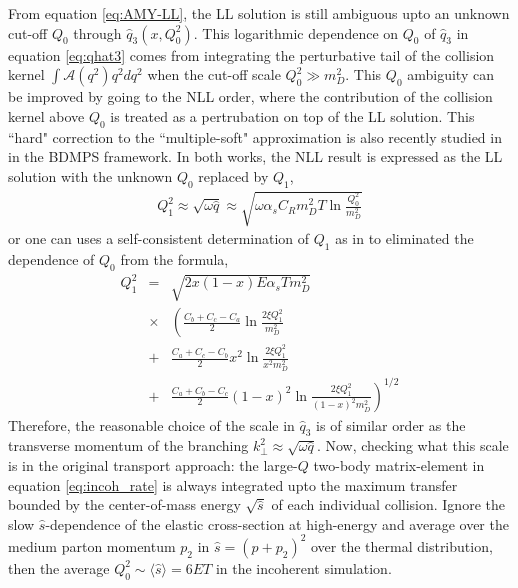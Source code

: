 \documentclass[aps, prc, reprint, amsmath, groupedaddress, nofootinbib]{revtex4-1}
\begin{document}
From equation \ref{eq:AMY-LL}, the LL solution is still ambiguous upto an unknown cut-off $Q_0$ through $\hat{q}_3(x, Q_0^2)$.
This logarithmic dependence on $Q_0$ of $\hat{q}_3$ in equation \ref{eq:qhat3} comes from integrating the perturbative tail of the collision kernel $\int \mathcal{A}(q^2) q^2 dq^2$ when the cut-off scale $Q_0^2 \gg m_D^2$.
This $Q_0$ ambiguity can be improved by going to the NLL order, where the contribution of the collision kernel above $Q_0$ is treated as a pertrubation on top of the LL solution.
This ``hard" correction to the ``multiple-soft" approximation is also recently studied in \cite{Mehtar-Tani:2019tvy} in the BDMPS framework.
In both works, the NLL result is expressed as the LL solution with the unknown $Q_0$ replaced by $Q_1$,
\begin{eqnarray}
Q_1^2  \approx \sqrt{\omega \hat{q}} \approx \sqrt{\omega \alpha_s C_R m_D^2 T \ln\frac{Q_0^2}{m_D^2}}
\label{eq:Q1}
\end{eqnarray}
or one can uses a self-consistent determination of $Q_1$ as in \cite{Arnold:2008zu} to eliminated the dependence of $Q_0$ from the formula,
\begin{eqnarray}
Q_1^2 &=& \sqrt{2 x (1-x) E \alpha_s T m_D^2}\\\nonumber
&\times & \left(
\frac{C_b+C_c-C_a}{2}\ln\frac{2\xi Q_1^2}{m_D^2} \right.\\\nonumber 
&+& \frac{C_a+C_c-C_b}{2} x^2 \ln\frac{2\xi Q_1^2}{x^2 m_D^2} \\\nonumber 
&+& \left.\frac{C_a+C_b-C_c}{2} (1-x)^2 \ln\frac{2\xi Q_1^2}{(1-x)^2 m_D^2} \right)^{1/2}
\label{eq:Q1-sf}
\end{eqnarray}
Therefore, the reasonable choice of the scale in $\hat{q}_3$ is of similar order as the transverse momentum of the branching $k_\perp^2 \approx \sqrt{\omega \hat{q}}$.
Now, checking what this scale is in the original transport approach: the large-$Q$ two-body matrix-element in equation \ref{eq:incoh_rate} is always integrated upto the maximum transfer bounded by the center-of-mass energy $\sqrt{\hat{s}}$ of each individual collision. 
Ignore the slow $\hat{s}$-dependence of the elastic cross-section at high-energy and average over the medium parton momentum $p_2$ in $\hat{s} = (p+p_2)^2$ over the thermal distribution, then the average $Q_{0}^2 \sim \langle\hat{s}\rangle = 6ET$ in the incoherent simulation.
\end{document}
